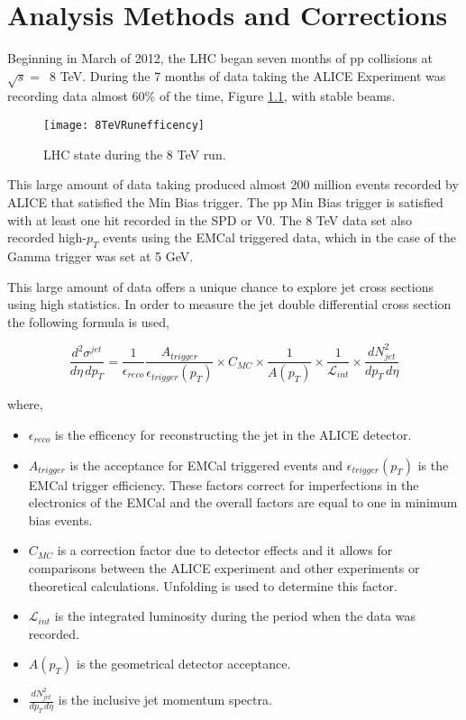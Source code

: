 \chapter{Analysis Methods and Corrections} \label{ch:analysis}

Beginning in March of 2012, the LHC began seven months of pp collisions at $\sqrt{s} = \,$ 8 TeV. During the 7 months of data taking the ALICE Experiment was recording data almost 60\% of the time, Figure \ref{fig:RunEff}, with stable beams.

\begin{figure}[h]
\texttt{[image: 8TeVRunefficency]}
\centering
\caption{LHC state during the 8 TeV run. }
\label{fig:RunEff}
\end{figure}


This large amount of data taking produced almost 200 million events recorded by ALICE that satisfied the Min Bias trigger.  The pp Min Bias trigger is satisfied with at least one hit recorded in the SPD or V0.  The 8 TeV data set also recorded high-$p_{T}$ events using the EMCal triggered data, which in the case of the Gamma trigger was set at 5 GeV.  

This large amount of data offers a unique chance to explore jet cross sections using high statistics.   In order to measure the jet double differential cross section the following formula is used,

\begin{equation}
	\frac{d^{2} \sigma^{jet}}{d\eta \, dp_{T}} = \frac{1}{\epsilon_{reco}} \frac{A_{trigger}}{\epsilon_{trigger}(p_{T})} \times C_{MC} \times \frac{1}{A(p_{T}) } \times \frac{1}{\mathscr{L}_{int}} \times \frac{dN^{2}_{jet}}{dp_{T} \, d\eta}
\label{eq:xsecdef}
\end{equation}

\noindent
where,

\begin{itemize}
  \item $\epsilon_{reco}$ is the efficency for reconstructing the jet in the ALICE detector.
  \item $A_{trigger}$ is the acceptance for EMCal triggered events and $\epsilon_{trigger}(p_{T})$ is the EMCal trigger efficiency.  These factors correct for imperfections in the electronics of the EMCal and the overall factors are equal to one in minimum bias events.
  \item $C_{MC}$ is a correction factor due to detector effects and it allows for comparisons between the ALICE experiment and other experiments or theoretical calculations.  Unfolding is used to determine this factor.
  \item $\mathscr{L}_{int}$ is the integrated luminosity during the period when the data was recorded.
  \item $A(p_{T})$ is the geometrical detector acceptance.
  \item $\frac{dN^{2}_{jet}}{dp_{T} \, d\eta}$ is the inclusive jet momentum spectra.
  
\end{itemize}

